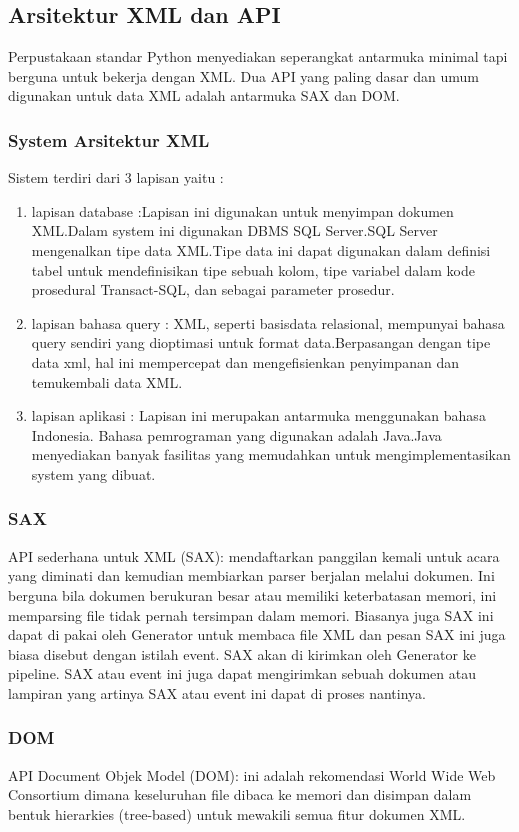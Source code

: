 \subsection {Arsitektur XML dan API}
  Perpustakaan standar Python menyediakan seperangkat antarmuka minimal tapi berguna untuk bekerja dengan XML. Dua API yang paling dasar dan umum digunakan untuk data XML adalah antarmuka SAX dan DOM. 
\subsubsection {System Arsitektur XML}
Sistem terdiri dari 3 lapisan yaitu :
\begin{enumerate}
\item lapisan database :Lapisan ini digunakan untuk menyimpan dokumen XML.Dalam system ini digunakan DBMS SQL Server.SQL
Server mengenalkan tipe data XML.Tipe data ini dapat digunakan dalam definisi tabel untuk mendefinisikan tipe sebuah kolom, tipe variabel dalam kode prosedural Transact-SQL, dan sebagai parameter prosedur.
\item lapisan bahasa query : XML, seperti basisdata relasional, mempunyai bahasa query sendiri yang dioptimasi untuk format data.Berpasangan dengan tipe data xml, hal ini mempercepat dan mengefisienkan penyimpanan dan temukembali data XML.
\item lapisan aplikasi : Lapisan ini merupakan antarmuka menggunakan bahasa Indonesia. Bahasa pemrograman yang digunakan adalah Java.Java menyediakan banyak fasilitas yang memudahkan untuk mengimplementasikan system yang dibuat.
\end{enumerate}

\subsubsection {SAX}
  API sederhana untuk XML (SAX): mendaftarkan panggilan kemali untuk acara yang diminati dan kemudian membiarkan parser berjalan melalui dokumen. Ini berguna bila dokumen berukuran besar atau memiliki keterbatasan memori, ini memparsing file tidak pernah tersimpan dalam memori. Biasanya juga SAX ini dapat di pakai oleh Generator untuk membaca file XML dan pesan SAX ini juga biasa disebut dengan istilah event. SAX akan di kirimkan oleh Generator ke pipeline. SAX atau event ini juga dapat mengirimkan sebuah dokumen atau lampiran yang artinya SAX atau event ini dapat di proses nantinya.
  
\subsubsection {DOM}
  API Document Objek Model (DOM): ini adalah rekomendasi World Wide Web Consortium dimana keseluruhan file dibaca ke memori dan disimpan dalam bentuk hierarkies (tree-based) untuk mewakili semua fitur dokumen XML. 

